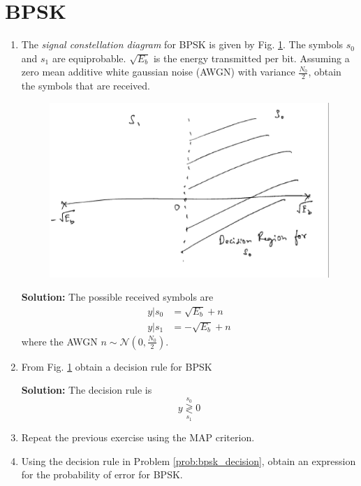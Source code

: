 \documentclass[journal,10pt,twocolumn]{IEEEtran}
\newcommand{\solution}{\noindent \textbf{Solution: }}
\providecommand{\dec}[2]{\ensuremath{\overset{#1}{\underset{#2}{\gtrless}}}}
\providecommand{\gauss}[2]{\mathcal{N}\ensuremath{\left(#1,#2\right)}}
\begin{document}
\section{BPSK}
\begin{enumerate}
\item
The {\em signal constellation diagram} for BPSK is given by Fig. \ref{fig:bpsk_const}.  The symbols $s_0$ and $s_1$ are equiprobable.  $\sqrt{E_b}$ is the energy transmitted per bit. Assuming a zero mean additive white gaussian noise (AWGN) with variance $\frac{N_0}{2}$,
obtain the symbols that are received.

%
\begin{figure}[H]
\centering
\includegraphics[width=\columnwidth]{./figs/chapter6/bpsk_const.eps}
\caption{}
\label{fig:bpsk_const}
\end{figure}
\solution The possible received symbols are
\begin{align}
y|s_0 &= \sqrt{E_b} + n
\\
y|s_1 &= -\sqrt{E_b} + n
\end{align}
%
where the AWGN $n \sim \gauss{0}{\frac{N_0}{2}}$.
%
\item
\label{prob:bpsk_decision}
From Fig. \ref{fig:bpsk_const} obtain a decision rule for BPSK

\solution The decision rule is
\begin{equation}
y \dec{s_0}{s_1} 0
\end{equation}
\item
Repeat the previous exercise using the MAP criterion.

\item
Using the decision rule in Problem \ref{prob:bpsk_decision}, obtain an expression for the probability of error for BPSK.


\end{enumerate}
\end{document}
